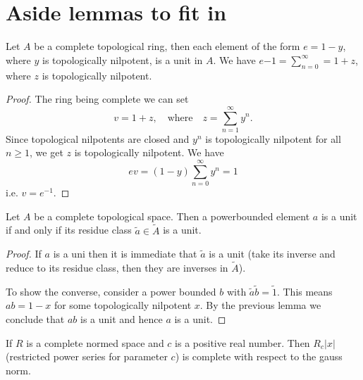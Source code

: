 \section{Aside lemmas to fit in}

\begin{lemma}
  Let $A$ be a complete topological ring, then each element of the form $e = 1 - y$, where $y$ is topologically
  nilpotent, is a unit in $A$.
  We have $ e{-1} = \sum_{n=0}^\infty = 1 + z$, where $z$ is topologically nilpotent.
\end{lemma}

\begin{proof}
  The ring being complete we can set
  \[
    v = 1 + z, \quad \text{where} \quad z = \sum_{n=1}^\infty y^n.
  \]
  Since topological nilpotents are closed and $y^n$ is topologically nilpotent for all $n \geq 1$, we
  get $z$ is topologically nilpotent. We have
  \[
    e v = (1 - y) \sum_{n = 0}^{\infty} y^n = 1
  \]
  i.e. $v = e^{-1}$.
\end{proof}


\begin{lemma}
  Let $A$ be a complete topological space. Then a powerbounded element $a$ is a unit if and only if
  its residue class $\tilde{a} \in \tilde{A}$ is a unit.
\end{lemma}

\begin{proof}
  If $a$ is a uni then it is immediate that $\tilde{a}$ is a unit (take its inverse and reduce to
  its residue class, then they are inverses in $\tilde{A}$).

  To show the converse, consider a power bounded $b$ with $\tilde{a} \tilde{b} = \tilde{1}$. This
  means $a b = 1 - x$ for some topologically nilpotent $x$. By the previous lemma we conclude that
  $ab$ is a unit and hence $a$ is a unit.
\end{proof}

\begin{lemma}
  If $R$ is a complete normed space and $c$ is a positive real number. Then $R_c\lvert x \rvert$
  (restricted power series for parameter $c$) is complete with respect to the gauss norm.
\end{lemma}

